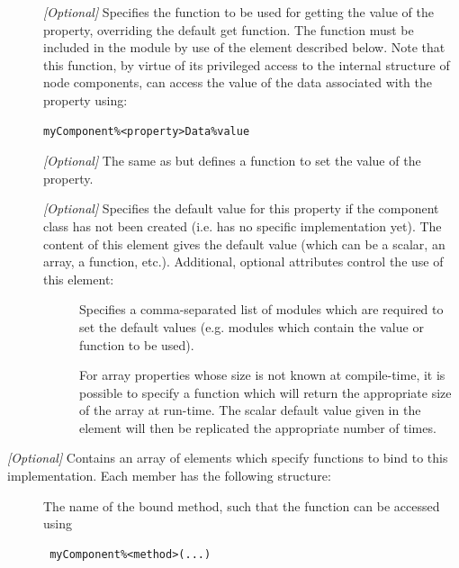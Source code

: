 \begin{description}
\begin{description}
\item [] \emph{[Optional]} Specifies the function to be used for getting the value of the property, overriding the default get function. The function must be included in the \href{https://github.com/galacticusorg/galacticus/releases/download/bleeding-edge/Galacticus_Source.pdf#source.objects_nodes_F90:galacticus_nodes} module by use of the  element described below. Note that this function, by virtue of its privileged access to the internal structure of node components, can access the value of the data associated with the property using:
\begin{verbatim}
myComponent%<property>Data%value
\end{verbatim}
\item [] \emph{[Optional]} The same as  but defines a function to set the value of the property.
\item [] \emph{[Optional]} Specifies the default value for this property if the component class has not been created (i.e. has no specific implementation yet). The content of this element gives the default value (which can be a scalar, an array, a function, etc.). Additional, optional attributes control the use of this element:
\begin{description}
 \item [] Specifies a comma-separated list of modules which are required to set the default values (e.g. modules which contain the value or function to be used).
 \item [] For array properties whose size is not known at compile-time, it is possible to specify a function which will return the appropriate size of the array at run-time. The scalar default value given in the  element will then be replicated the appropriate number of times.
\end{description}
\end{description}
\item [\mono{bindings}] \emph{[Optional]} Contains an array of  elements which specify functions to bind to this implementation. Each member  has the following structure:
\begin{description}
\item [] The name of the bound method, such that the function can be accessed using
\begin{verbatim}
 myComponent%<method>(...)

\end{verbatim}
\end{description}
\end{description}
